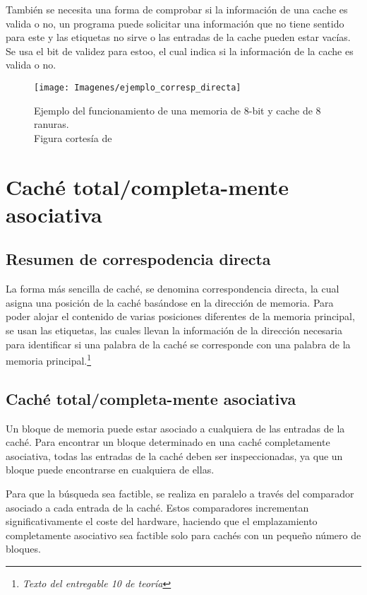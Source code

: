 \documentclass[12pt]{article}
\begin{document}
	También se necesita una forma de comprobar si la información de una cache es valida o no, un programa puede solicitar una información que no tiene sentido para este y las etiquetas no sirve o las entradas de la cache pueden estar vacías. Se usa el bit de validez para estoo, el cual indica si la información de la cache es valida o no.\\

	\begin{figure}[H]
		\centering
		\texttt{[image: Imagenes/ejemplo\_corresp\_directa]}
		\caption{Ejemplo del funcionamiento de una memoria de 8-bit y cache de 8 ranuras.\\
			Figura cortesía de \cite{kumar-2023}}
		\label{fig:ejemplocorrespdirecta}
	\end{figure}

	\newpage


	\section{Caché total/completa-mente asociativa}

	\subsection{Resumen de correspodencia directa}

	La forma más sencilla de caché, se denomina correspondencia directa,
	la cual asigna una posición de la caché basándose en la dirección de
	memoria.
	Para poder alojar el contenido de varias posiciones diferentes de
	la memoria principal, se usan las etiquetas, las cuales llevan la información
	de la dirección necesaria para identificar si una palabra de la
	caché se corresponde con una palabra de la memoria principal.\footnote{\textit{Texto del entregable 10 de teoría}}

	\subsection{Caché total/completa-mente asociativa}

	Un bloque de memoria puede estar asociado a cualquiera de las entradas de la caché. Para encontrar un bloque determinado en una caché completamente asociativa, todas las entradas de la caché deben ser inspeccionadas, ya que un bloque puede encontrarse en cualquiera de ellas.

	Para que la búsqueda sea factible, se realiza en paralelo a través del comparador asociado a cada entrada de la caché. Estos comparadores incrementan significativamente el coste del hardware, haciendo que el emplazamiento completamente asociativo sea factible solo para cachés con un pequeño número de bloques. \cite{patterson-2011}\\
\end{document}
